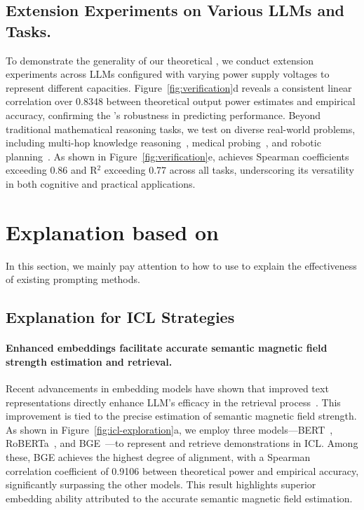 \subsection{Extension Experiments on Various LLMs and Tasks.}\vspace{-3pt}
To demonstrate the generality of our theoretical \modelname{}, we conduct extension experiments across LLMs configured with varying power supply voltages to represent different capacities. Figure~\ref{fig:verification}d reveals a consistent linear correlation over 0.8348 between theoretical output power estimates and empirical accuracy, confirming the \modelname{}'s robustness in predicting performance. Beyond traditional mathematical reasoning tasks, we test \modelname{} on diverse real-world problems, including multi-hop knowledge reasoning~\citep{yang-etal-2018-hotpotqa}, medical probing~\citep{cheng2024adapting}, and robotic planning~\citep{valmeekam2023planbench}. As shown in Figure~\ref{fig:verification}e, \modelname{} achieves Spearman coefficients exceeding 0.86 and R$^2$ exceeding 0.77 across all tasks, underscoring its versatility in both cognitive and practical applications.\vspace{-3pt}

\section{Explanation based on \modelname{}}\vspace{-3pt}
In this section, we mainly pay attention to how to use \modelname{} to explain the effectiveness of existing prompting methods.
\subsection{Explanation for ICL Strategies}
\paragraph{Enhanced embeddings facilitate accurate semantic magnetic field strength estimation and retrieval.}
Recent advancements in embedding models have shown that improved text representations directly enhance LLM's efficacy in the retrieval process~\citep{liu2024incontext}.
This improvement is tied to the precise estimation of semantic magnetic field strength. As shown in Figure~\ref{fig:icl-exploration}a, we employ three models—BERT~\cite{devlin-etal-2019-bert}, RoBERTa~\cite{liu2019roberta}, and BGE~\cite{chen2024bge}—to represent and retrieve demonstrations in ICL.
Among these, BGE achieves the highest degree of alignment, with a Spearman correlation coefficient of 0.9106 between theoretical power and empirical accuracy, significantly surpassing the other models. This result highlights superior embedding ability attributed to the accurate semantic magnetic field estimation.



